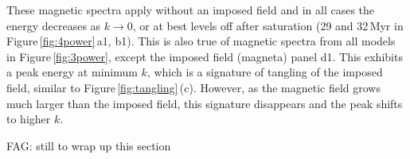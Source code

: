 \documentclass[preprint2]{aastex63}
\newcommand\SNr{\dot\sigma_{\rm sn}}
\newcommand\kpc{~ {\rm kpc}}
\newcommand\pc{~ {\rm pc}}
\newcommand\dx{ {\delta x}}
\newcommand{\fg}[1]{\textcolor{midgreen}{#1}}
\newcommand{\fag}[1]{\textcolor{midblue}{FAG: #1}}
\begin{document}
 \fg{These magnetic spectra apply without an imposed field and in all cases
 the energy decreases as $k\rightarrow0$, or at best levels off after 
 saturation (29 and 32\,Myr in Figure\,\ref{fig:4power}\,a1, b1).
 This is also true of magnetic spectra from all models in
 Figure\,\ref{fig:3power}, except the imposed field (magneta) panel d1.
 This exhibits a peak energy at minimum $k$, which is a signature of tangling 
 of the imposed field, similar to Figure\,\ref{fig:tangling}\,(c).
 However, as the magnetic field grows much larger than the imposed field,
 this signature disappears and the peak shifts to higher $k$. }
 
 \fag{still to wrap up this section}
 

\end{document}
